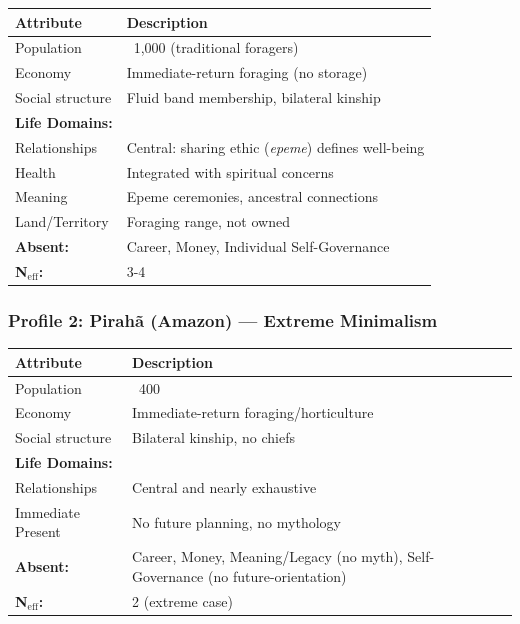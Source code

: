 \begin{center}
\begin{tabular}{@{}lp{8cm}@{}}
\toprule
\textbf{Attribute} & \textbf{Description} \\
\midrule
Population & ~1,000 (traditional foragers) \\
Economy & Immediate-return foraging (no storage) \\
Social structure & Fluid band membership, bilateral kinship \\
\midrule
\textbf{Life Domains:} & \\
Relationships & Central: sharing ethic (\textit{epeme}) defines well-being \\
Health & Integrated with spiritual concerns \\
Meaning & Epeme ceremonies, ancestral connections \\
Land/Territory & Foraging range, not owned \\
\midrule
\textbf{Absent:} & Career, Money, Individual Self-Governance \\
\textbf{N$_{\text{eff}}$:} & 3-4 \\
\bottomrule
\end{tabular}
\end{center}

\subsubsection{Profile 2: Pirahã (Amazon) --- Extreme Minimalism}

\begin{center}
\begin{tabular}{@{}lp{8cm}@{}}
\toprule
\textbf{Attribute} & \textbf{Description} \\
\midrule
Population & ~400 \\
Economy & Immediate-return foraging/horticulture \\
Social structure & Bilateral kinship, no chiefs \\
\midrule
\textbf{Life Domains:} & \\
Relationships & Central and nearly exhaustive \\
Immediate Present & No future planning, no mythology \\
\midrule
\textbf{Absent:} & Career, Money, Meaning/Legacy (no myth), Self-Governance (no future-orientation) \\
\textbf{N$_{\text{eff}}$:} & 2 (extreme case) \\
\bottomrule
\end{tabular}
\end{center}

